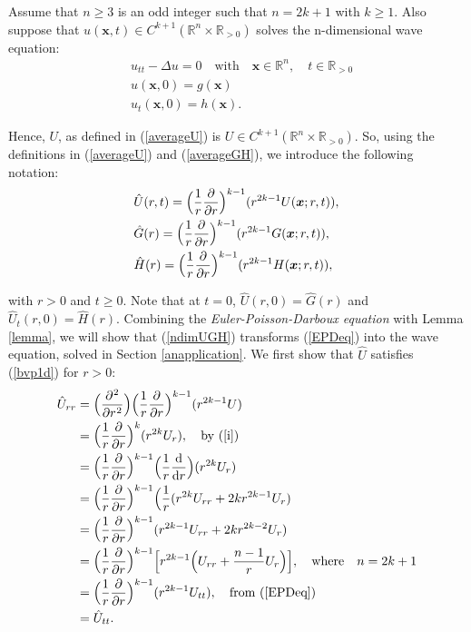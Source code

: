 \documentclass[a4paper, 12pt]{article}
\numberwithin{equation}{section}
\begin{document}
Assume that $n \ge 3$ is an odd integer such that $n=2k+1$ with $k \ge 1$. Also
suppose that $u(\boldsymbol{x},t) \in C^{k+1}(\mathbb{R}^n \times \mathbb{R}_{>0})$
solves the n-dimensional wave equation:
\begin{equation} \label{ndimeq}
    \begin{aligned}
        &u_{tt}-\Delta u =0 \quad \textrm{with} \quad \boldsymbol{x} \in \mathbb{R}^n, \quad t \in \mathbb{R}_{>0}\\
        &u(\boldsymbol{x}, 0)=g(\boldsymbol{x})\\
        &u_t(\boldsymbol{x},0)=h(\boldsymbol{x}).
    \end{aligned}
\end{equation} 

Hence, $U$, as defined in (\ref{averageU}) is $U \in C^{k+1}(\mathbb{R}^n \times
\mathbb{R}_{>0})$. So, using the definitions in (\ref{averageU}) and
(\ref{averageGH}), we introduce the following notation:
\begin{equation} \label{ndimUGH}
    \begin{aligned}
        &\hat{U}(r,t)=\Big(\frac{1}{r} \diffp[1]{}{r} \Big)^{k-1} (r^{2k-1}U(\boldsymbol{x};r,t)),\\
        &\hat{G}(r)=\Big(\frac{1}{r} \diffp[1]{}{r} \Big)^{k-1} (r^{2k-1}G(\boldsymbol{x};r,t)),\\
        &\hat{H}(r)=\Big(\frac{1}{r} \diffp[1]{}{r} \Big)^{k-1} (r^{2k-1}H(\boldsymbol{x};r,t)),
    \end{aligned}
\end{equation}

with $r>0$ and $t \ge 0$. Note that at $t=0$, $\hat{U}(r,0)=\hat{G}(r)$ and
$\hat{U}_t(r,0)=\hat{H}(r)$. Combining the \emph{Euler-Poisson-Darboux equation} with
Lemma \ref{lemma}, we will show that (\ref{ndimUGH}) transforms (\ref{EPDeq})
into the wave equation, solved in Section \ref{anapplication}. We first show
that $\hat{U}$ satisfies (\ref{bvp1d}) for $r>0$:
\begin{equation*}
    \begin{aligned}
        \hat{U}_{rr}&=\Big(\diffp[2]{}{r}\Big)\Big(\frac{1}{r} \diffp[1]{}{r}\Big)^{k-1}(r^{2k-1}U)\\
        &=\Big(\frac{1}{r} \diffp[1]{}{r}\Big)^k(r^{2k}U_r), \quad \textrm{by (\ref{i})}\\
        &=\Big(\frac{1}{r} \diffp[1]{}{r}\Big)^{k-1}\Big(\frac{1}{r}\diff{}{r}\Big)(r^{2k}U_r)\\
        &=\Big(\frac{1}{r} \diffp[1]{}{r}\Big)^{k-1}\Big(\frac{1}{r}(r^{2k}U_{rr}+2kr^{2k-1}U_r)\\
        &=\Big(\frac{1}{r} \diffp[1]{}{r}\Big)^{k-1}(r^{2k-1}U_{rr}+2kr^{2k-2}U_r)\\
        &=\Big(\frac{1}{r} \diffp[1]{}{r}\Big)^{k-1}\Big[r^{2k-1}\Big(U_{rr}+\frac{n-1}{r}U_r\Big)\Big], \quad \textrm{where} \quad n=2k+1\\
        &=\Big(\frac{1}{r} \diffp[1]{}{r}\Big)^{k-1}(r^{2k-1}U_{tt}), \quad \textrm{from (\ref{EPDeq})}\\
        &=\hat{U}_{tt}.
    \end{aligned}
\end{equation*}
\end{document}

